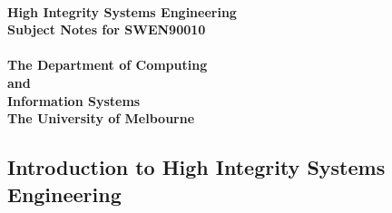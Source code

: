 \documentclass[11pt]{report}
\begin{document}
%

\mbox{}\\
\vspace{10ex}
\begin{center}
\textbf{\Huge High Integrity Systems Engineering}\\[1ex]
\textbf{\Large Subject Notes for SWEN90010}\\[1ex]
\mbox{}\\[6ex]
\textbf{\Large The Department of Computing}\\[0.5ex]
\textbf{\large and}\\[0.5ex]
\textbf{\Large Information Systems}\\[1.5ex]
\textbf{\large The University of Melbourne}\\[0.5ex]
\end{center}
\vspace{10ex}

\newpage

%

\tableofcontents

\begin{bibunit}[plain]
\chapter{Introduction to High Integrity Systems Engineering}


\putbib[bib]
\end{bibunit}

\begin{bibunit}[plain]

\putbib[bib]
\end{bibunit}


\begin{bibunit}[plain]

\putbib[bib]
\end{bibunit}

\begin{bibunit}[plain]

\putbib[bib]
\end{bibunit}

\begin{bibunit}[plain]

\putbib[bib]
\end{bibunit}

\begin{bibunit}[plain]

\putbib[bib]
\end{bibunit}
\end{document}
